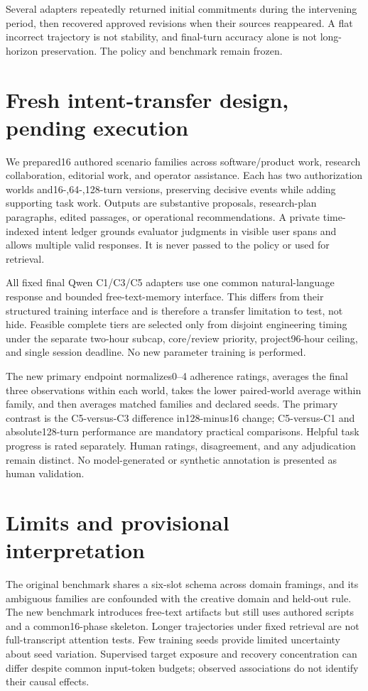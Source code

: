 \documentclass{svproc}
\begin{document}
Several adapters repeatedly returned initial commitments during the intervening period, then recovered approved revisions when their sources reappeared. A flat incorrect trajectory is not stability, and final-turn accuracy alone is not long-horizon preservation. The policy and benchmark remain frozen.

\section{Fresh intent-transfer design, pending execution}

We prepared16 authored scenario families across software/product work, research collaboration, editorial work, and operator assistance. Each has two authorization worlds and16-,64-,128-turn versions, preserving decisive events while adding supporting task work. Outputs are substantive proposals, research-plan paragraphs, edited passages, or operational recommendations. A private time-indexed intent ledger grounds evaluator judgments in visible user spans and allows multiple valid responses. It is never passed to the policy or used for retrieval.

All fixed final Qwen C1/C3/C5 adapters use one common natural-language response and bounded free-text-memory interface. This differs from their structured training interface and is therefore a transfer limitation to test, not hide. Feasible complete tiers are selected only from disjoint engineering timing under the separate two-hour subcap, core/review priority, project96-hour ceiling, and single session deadline. No new parameter training is performed.

The new primary endpoint normalizes0--4 adherence ratings, averages the final three observations within each world, takes the lower paired-world average within family, and then averages matched families and declared seeds. The primary contrast is the C5-versus-C3 difference in128-minus16 change; C5-versus-C1 and absolute128-turn performance are mandatory practical comparisons. Helpful task progress is rated separately. Human ratings, disagreement, and any adjudication remain distinct. No model-generated or synthetic annotation is presented as human validation.

\section{Limits and provisional interpretation}

The original benchmark shares a six-slot schema across domain framings, and its ambiguous families are confounded with the creative domain and held-out rule. The new benchmark introduces free-text artifacts but still uses authored scripts and a common16-phase skeleton. Longer trajectories under fixed retrieval are not full-transcript attention tests. Few training seeds provide limited uncertainty about seed variation. Supervised target exposure and recovery concentration can differ despite common input-token budgets; observed associations do not identify their causal effects.
\end{document}
